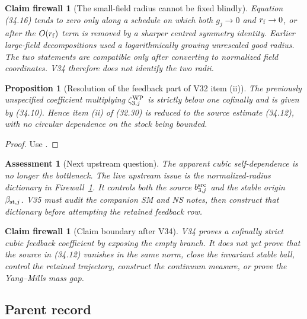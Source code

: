\documentclass[11pt,oneside]{book}
\newtheorem{proposition}[theorem]{Proposition}
\newtheorem{assessment}[theorem]{Assessment}
\newtheorem{firewall}[theorem]{Claim firewall}
\theoremstyle{definition}
\theoremstyle{remark}
\begin{document}
\begin{firewall}[The small-field radius cannot be fixed blindly]
\label{fire:e8v34-radius-source}
Equation (34.16) tends to zero only along a schedule on which both
\(g_j\to0\) and \(r_{\rm f}\to0\), or after the \(O(r_{\rm f})\)
term is removed by a sharper centred symmetry identity.  Earlier
large-field decompositions used a logarithmically growing
unrescaled good radius.  The two statements are compatible only
after converting to normalized field coordinates.  V34 therefore
does not identify the two radii.
\end{firewall}

\begin{proposition}[Resolution of the feedback part of V32 item (ii)]
\label{prop:e8v34-item-ii}
The previously unspecified coefficient multiplying
\(\zeta_{3,j}^{\rm WP}\) is strictly below one cofinally and is
given by (34.10).  Hence item (ii) of (32.30) is reduced to the
source estimate (34.12), with no circular dependence on the stock
being bounded.
\end{proposition}

\begin{proof}
Use
.
\end{proof}

\begin{assessment}[Next upstream question]
\label{ass:e8v34-status}
The apparent cubic self-dependence is no longer the bottleneck.
The live upstream issue is the normalized-radius dictionary in
Firewall~\ref{fire:e8v34-radius-source}.  It controls both the source
\(b_{3,j}^{\rm src}\) and the stable origin
\(\beta_{{\rm st},j}\).  V35 must audit the companion SM and NS
notes, then construct that dictionary before attempting the retained
feedback row.
\end{assessment}

\begin{firewall}[Claim boundary after V34]
\label{fire:e8v34-claim}
V34 proves a cofinally strict cubic feedback coefficient by exposing
the empty branch.  It does not yet prove that the source in (34.12)
vanishes in the same norm, close the invariant stable ball, control
the retained trajectory, construct the continuum measure, or prove
the Yang--Mills mass gap.
\end{firewall}

\subsection{Parent record}
\end{document}
